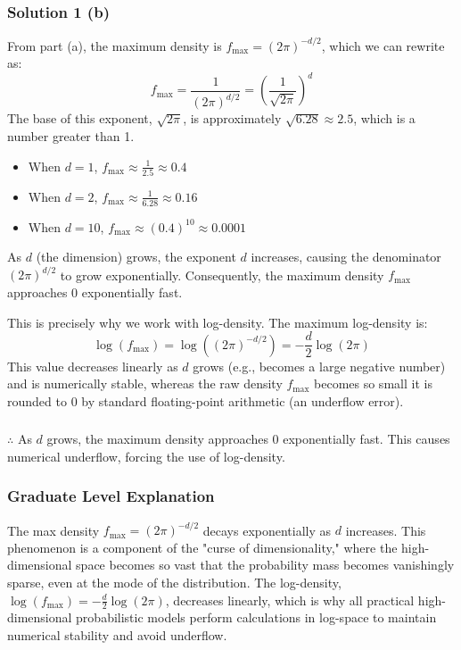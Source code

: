 \documentclass{article}
\begin{document}
\subsubsection*{Solution 1 (b)}
From part (a), the maximum density is $f_{\text{max}} = (2\pi)^{-d/2}$, which we can rewrite as:
$$ f_{\text{max}} = \frac{1}{(2\pi)^{d/2}} = \left( \frac{1}{\sqrt{2\pi}} \right)^d $$
The base of this exponent, $\sqrt{2\pi}$, is approximately $\sqrt{6.28} \approx 2.5$, which is a number greater than 1.
\begin{itemize}
    \item When $d=1$, $f_{\text{max}} \approx \frac{1}{2.5} \approx 0.4$
    \item When $d=2$, $f_{\text{max}} \approx \frac{1}{6.28} \approx 0.16$
    \item When $d=10$, $f_{\text{max}} \approx (0.4)^{10} \approx 0.0001$
\end{itemize}
As $d$ (the dimension) grows, the exponent $d$ increases, causing the denominator $(2\pi)^{d/2}$ to grow exponentially.
Consequently, the maximum density $f_{\text{max}}$ approaches $0$ exponentially fast.

This is precisely why we work with log-density. The maximum log-density is:
$$ \log(f_{\text{max}}) = \log\left( (2\pi)^{-d/2} \right) = -\frac{d}{2} \log(2\pi) $$
This value decreases linearly as $d$ grows (e.g., becomes a large negative number) and is numerically stable, whereas the raw density $f_{\text{max}}$ becomes so small it is rounded to $0$ by standard floating-point arithmetic (an underflow error).

\subsubsection*{\normalfont}{$\therefore$ As $d$ grows, the maximum density approaches $0$ exponentially fast. This causes numerical underflow, forcing the use of log-density.}

\subsubsection*{Graduate Level Explanation}
The max density $f_{\text{max}} = (2\pi)^{-d/2}$ decays exponentially as $d$ increases. This phenomenon is a component of the "curse of dimensionality," where the high-dimensional space becomes so vast that the probability mass becomes vanishingly sparse, even at the mode of the distribution. The log-density, $\log(f_{\text{max}}) = -\frac{d}{2}\log(2\pi)$, decreases linearly, which is why all practical high-dimensional probabilistic models perform calculations in log-space to maintain numerical stability and avoid underflow.
\end{document}

